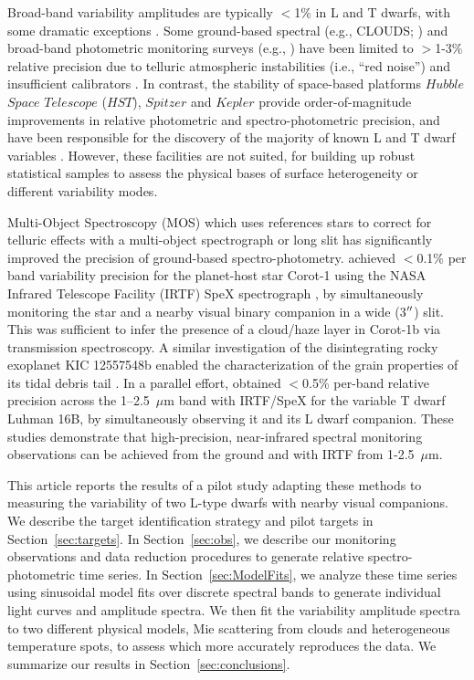 \documentclass[twocolumn]{aastex6}
\begin{document}
Broad-band variability amplitudes are typically $<$1\% in L and T dwarfs, with some dramatic exceptions \citep{2009ApJ...701.1534A,2012ApJ...750..105R,2013A&A...555L...5G,2016ApJ...829L..32L}. 
Some ground-based spectral (e.g., CLOUDS; \citealt{2008A&A...487..277G}) and broad-band photometric monitoring surveys (e.g., \citealt{1999A&A...348..800B,2003MNRAS.346..473K,2014ApJ...793...75R,2014A&A...566A.111W}) have been limited to $>$1-3\% relative precision due to telluric atmospheric instabilities (i.e., ``red noise'') and insufficient calibrators \citep{2003MNRAS.339..477B}.
In contrast, the stability of space-based platforms $Hubble$ $Space$ $Telescope$ ($HST$), $Spitzer$ and $Kepler$ provide order-of-magnitude improvements in relative photometric and spectro-photometric precision, and have been responsible for the discovery of the majority of known L and T dwarf variables \citep{2013ApJ...768..121A,2013ApJ...779..172G,2015ApJ...799..154M}. However, these facilities are not suited, for building up robust statistical samples to assess the physical bases of surface heterogeneity or different variability modes.

Multi-Object Spectroscopy (MOS) which uses references stars to correct for telluric effects with a multi-object spectrograph or long slit \citep[e.g.][]{bean10,bean2013,gibson13clouds,stevenson2016hatp26} has significantly improved the precision of ground-based spectro-photometry. \citet{2014ApJ...783....5S} achieved $<$0.1\% per band variability precision for the planet-host star Corot-1 using the NASA Infrared Telescope Facility (IRTF) SpeX spectrograph \citep{2003PASP..115..362R}, by simultaneously monitoring the star and a nearby visual binary companion in a wide (3$\mbox{$^{\prime\prime}$}$) slit. This was sufficient to infer the presence of a cloud/haze layer in Corot-1b via transmission spectroscopy. A similar investigation of the disintegrating rocky exoplanet KIC 12557548b  enabled the characterization of the grain properties of its tidal debris tail \citep{2016ApJ...826..156S}. In a parallel effort, \citet{2014ApJ...785...48B} obtained $<$0.5\% per-band relative precision across the 1--2.5~$\mu$m band with IRTF/SpeX for the variable T dwarf Luhman 16B, by simultaneously observing it and its L dwarf companion. These studies demonstrate that high-precision, near-infrared spectral monitoring observations can be achieved from the ground and with IRTF from 1-2.5~$\mu$m.

This article reports the results of a pilot study adapting these methods to measuring the variability of two L-type dwarfs with nearby visual companions. We describe the target identification strategy and pilot targets in Section~\ref{sec:targets}.
In Section~\ref{sec:obs}, we describe our monitoring observations and data reduction procedures to generate relative spectro-photometric time series.
In Section~\ref{sec:ModelFits}, we analyze these time series using sinusoidal model fits over discrete spectral bands to generate individual light curves and amplitude spectra.
We then fit the variability amplitude spectra to two different physical models, Mie scattering from clouds and heterogeneous temperature spots, to assess which more accurately reproduces the data.
We summarize our results in Section~\ref{sec:conclusions}.
\end{document}
